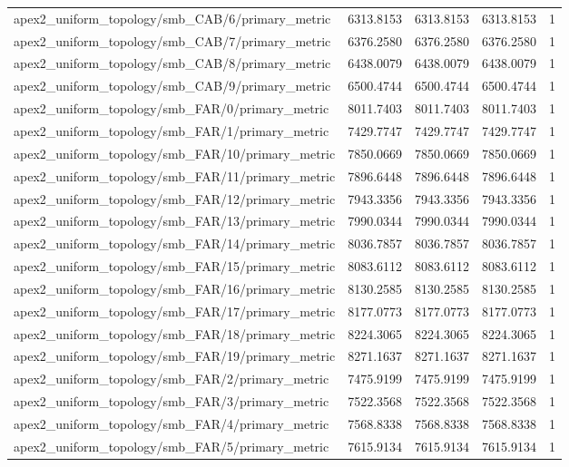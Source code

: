 \begin{table}[h]
\begin{tabular}{lrrrr}
apex2_uniform_topology/smb_CAB/6/primary_metric & 6313.8153 & 6313.8153 & 6313.8153 & 1 \\
apex2_uniform_topology/smb_CAB/7/primary_metric & 6376.2580 & 6376.2580 & 6376.2580 & 1 \\
apex2_uniform_topology/smb_CAB/8/primary_metric & 6438.0079 & 6438.0079 & 6438.0079 & 1 \\
apex2_uniform_topology/smb_CAB/9/primary_metric & 6500.4744 & 6500.4744 & 6500.4744 & 1 \\
apex2_uniform_topology/smb_FAR/0/primary_metric & 8011.7403 & 8011.7403 & 8011.7403 & 1 \\
apex2_uniform_topology/smb_FAR/1/primary_metric & 7429.7747 & 7429.7747 & 7429.7747 & 1 \\
apex2_uniform_topology/smb_FAR/10/primary_metric & 7850.0669 & 7850.0669 & 7850.0669 & 1 \\
apex2_uniform_topology/smb_FAR/11/primary_metric & 7896.6448 & 7896.6448 & 7896.6448 & 1 \\
apex2_uniform_topology/smb_FAR/12/primary_metric & 7943.3356 & 7943.3356 & 7943.3356 & 1 \\
apex2_uniform_topology/smb_FAR/13/primary_metric & 7990.0344 & 7990.0344 & 7990.0344 & 1 \\
apex2_uniform_topology/smb_FAR/14/primary_metric & 8036.7857 & 8036.7857 & 8036.7857 & 1 \\
apex2_uniform_topology/smb_FAR/15/primary_metric & 8083.6112 & 8083.6112 & 8083.6112 & 1 \\
apex2_uniform_topology/smb_FAR/16/primary_metric & 8130.2585 & 8130.2585 & 8130.2585 & 1 \\
apex2_uniform_topology/smb_FAR/17/primary_metric & 8177.0773 & 8177.0773 & 8177.0773 & 1 \\
apex2_uniform_topology/smb_FAR/18/primary_metric & 8224.3065 & 8224.3065 & 8224.3065 & 1 \\
apex2_uniform_topology/smb_FAR/19/primary_metric & 8271.1637 & 8271.1637 & 8271.1637 & 1 \\
apex2_uniform_topology/smb_FAR/2/primary_metric & 7475.9199 & 7475.9199 & 7475.9199 & 1 \\
apex2_uniform_topology/smb_FAR/3/primary_metric & 7522.3568 & 7522.3568 & 7522.3568 & 1 \\
apex2_uniform_topology/smb_FAR/4/primary_metric & 7568.8338 & 7568.8338 & 7568.8338 & 1 \\
apex2_uniform_topology/smb_FAR/5/primary_metric & 7615.9134 & 7615.9134 & 7615.9134 & 1 \\

\end{tabular}
\end{table}
